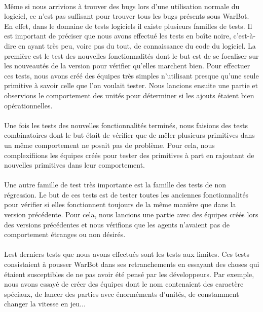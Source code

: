 \documentclass{report}
\begin{document}
\paragraph{}

Même si nous arrivions à trouver des bugs lors d’une utilisation normale du logiciel, ce n’est pas suffisant pour trouver tous les bugs présents sous WarBot. \newline
En effet, dans le domaine de tests logiciels il existe plusieurs familles de tests. Il est important de préciser que nous avons effectué les tests en boîte noire, c’est-à-dire en ayant très peu, voire pas du tout, de connaissance du code du logiciel. La première est le test des nouvelles fonctionnalités dont le but est de se focaliser sur les nouveautés de la version pour vérifier qu’elles marchent bien. Pour effectuer ces tests, nous avons créé des équipes très simples n’utilisant presque qu’une seule primitive à savoir celle que l’on voulait tester. Nous lancions ensuite une partie et observions le comportement des unités pour déterminer si les ajouts étaient bien opérationnelles.
\paragraph{}
  Une fois les tests des nouvelles fonctionnalités terminés, nous faisions des tests combinatoires dont le but était de vérifier que de mêler plusieurs primitives dans un même comportement ne posait pas de problème. Pour cela, nous complexifiions les équipes créés pour tester des primitives à part en rajoutant de nouvelles primitives dans leur comportement.
 \paragraph{}
  Une autre famille de test très importante est la famille des tests de non régression. Le but de ces tests est de tester toutes les anciennes fonctionnalités pour vérifier si elles fonctionnent toujours de la même manière que dans la version précédente. Pour cela, nous lancions une partie avec des équipes créés lors des versions précédentes et nous vérifions que les agents n’avaient pas de comportement étranges ou non désirés.
\paragraph{}
  Lest derniers tests que nous avons effectués sont les tests aux limites. Ces tests consistaient à pousser WarBot dans ses retranchements en essayant des choses qui étaient susceptibles de ne pas avoir été pensé par les développeurs. Par exemple, nous avons essayé de créer des équipes dont le nom contenaient des caractère spéciaux, de lancer des parties avec énorméments d’unités, de constamment changer la vitesse en jeu...
\end{document}
